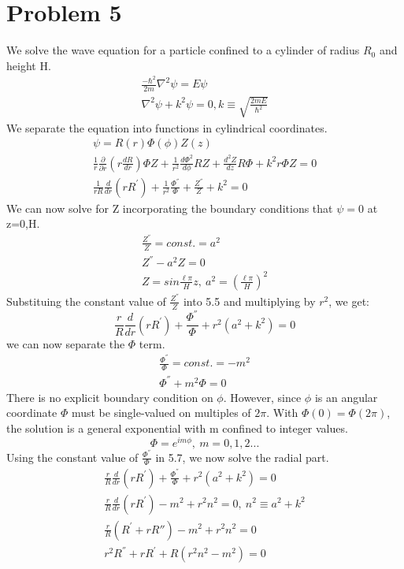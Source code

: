 \documentclass[a4paper,10pt]{article}
\numberwithin{equation}{section}
\begin{document}
\section{Problem 5}
We solve the wave equation for a particle confined to a cylinder of radius $R_0$ and height H.
\begin{gather}
\frac{-\hbar ^2}{2m} \nabla ^2 \psi=E \psi\\
\nabla ^2 \psi +k^2\psi=0, k\equiv \sqrt{\frac{2mE}{\hbar ^2}}
\end{gather}
We separate the equation into functions in cylindrical coordinates.
\begin{gather}
 \psi=R(r)\Phi(\phi)Z(z)\\
 \frac{1}{r}\frac{\partial}{\partial r}(r\frac{dR}{dr})\Phi Z+\frac{1}{r^2}\frac{d \Phi ^2}{d \phi }RZ+\frac{d^2Z}{dz}R\Phi +k^2r\Phi Z=0\\
 \frac{1}{rR}\frac{d}{dr}(rR^{'} )+\frac{1}{r^2}\frac{\Phi^{''} }{\Phi}+\frac{Z^{''}}{Z}+k^2=0
\end{gather}
We can now solve for Z incorporating the boundary conditions that $\psi=0$ at z=0,H.
\begin{gather}
\frac{Z^{''}}{Z}=const.=a^2\\
 Z^{''}-a^2Z=0\\
 Z=sin\frac{\ell \pi}{H}z,\ a^2=(\frac{\ell \pi}{H})^2
\end{gather}
Substituing the constant value of $\frac{Z^{''}}{Z}$ into 5.5 and multiplying by $r^2$, we get:
\begin{equation}
\frac{r}{R}\frac{d}{dr}(rR^{'})+\frac{\Phi ^{''}}{\Phi}+r^2(a^2+k^2)=0 
\end{equation}
we can now separate the $\Phi$ term.
\begin{gather}
\frac{\Phi ^{''}}{\Phi}=const.=-m^2\\
\Phi ^{''}+m^2\Phi=0
\end{gather}
There is no explicit boundary condition on $\phi$. 
However, since $\phi$ is an angular coordinate $\Phi$ must be single-valued on multiples of $2\pi$. 
With $\Phi(0)=\Phi(2\pi)$, the solution is a general exponential with m confined to integer values.
\begin{equation}
\Phi=e^{im \phi}, \  m=0,1,2...
\end{equation}
Using the constant value of $\frac{\Phi ^{''}}{\Phi } $ in 5.7, we now solve the radial part.
\begin{gather}
 \frac{r}{R}\frac{d}{dr}(rR^{'})+\frac{\Phi ^{''}}{\Phi}+r^2(a^2+k^2)=0 \\
 \frac{r}{R}\frac{d}{dr}(rR^{'})-m^2+r^2n^2=0,\  n^2\equiv a^2+k^2\\ 
 \frac{r}{R}(R^{'}+rR{''})-m^2+r^2n^2=0\\ 
 r^2R^{''}+rR^{'}+R(r^2n^2-m^2)=0
\end{gather}
\end{document}

